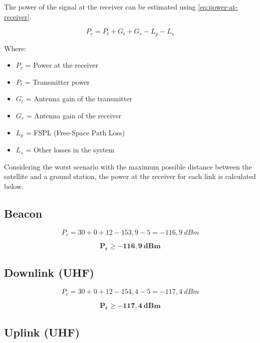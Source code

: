 The power of the signal at the receiver can be estimated using \autoref{eq:power-at-receiver}.

\begin{equation} \label{eq:power-at-receiver}
    P_{r} = P_{t} + G_{t} + G_{r} - L_{p} - L_{s}
\end{equation}

Where:

\begin{itemize}
    \item $P_{r}$ = Power at the receiver
    \item $P_{t}$ = Transmitter power
    \item $G_{t}$ = Antenna gain of the transmitter
    \item $G_{r}$ = Antenna gain of the receiver
    \item $L_{p}$ = FSPL (Free-Space Path Loss)
    \item $L_{s}$ = Other losses in the system
\end{itemize}

Considering the worst scenario with the maximum possible distance between the satellite and a ground station, the power at the receiver for each link is calculated below.

\subsection{Beacon}

\begin{equation}
    P_{r} = 30 + 0 + 12 - 153,9 - 5 = -116,9\ dBm
\end{equation}

\begin{equation}
    \mathbf{P_{r} \geq -116,9\ dBm}
\end{equation}

\subsection{Downlink (UHF)}

\begin{equation}
    P_{r} = 30 + 0 + 12 - 154,4 - 5 = -117,4\ dBm
\end{equation}

\begin{equation}
    \mathbf{P_{r} \geq -117,4\ dBm}
\end{equation}

\subsection{Uplink (UHF)}

